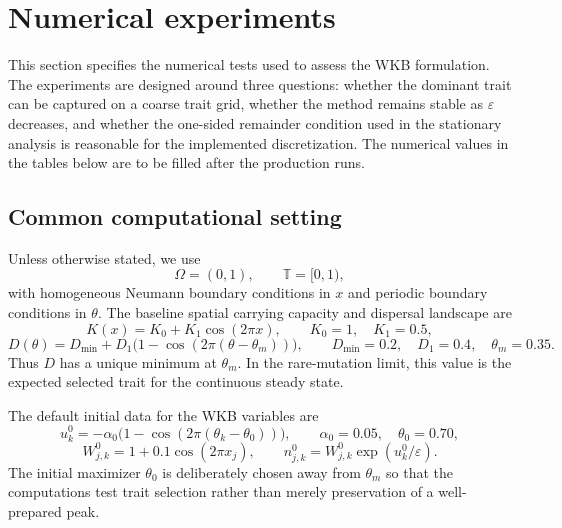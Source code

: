 \documentclass[11pt]{article}
\begin{document}

\section{Numerical experiments}

This section specifies the numerical tests used to assess the WKB formulation.
The experiments are designed around three questions: whether the dominant trait
can be captured on a coarse trait grid, whether the method remains stable as
\(\varepsilon\) decreases, and whether the one-sided remainder condition used
in the stationary analysis is reasonable for the implemented discretization.
The numerical values in the tables below are to be filled after the production
runs.

\subsection{Common computational setting}

Unless otherwise stated, we use
\[
    \Omega=(0,1),
    \qquad
    \mathbb T=[0,1),
\]
with homogeneous Neumann boundary conditions in \(x\) and periodic boundary
conditions in \(\theta\). The baseline spatial carrying capacity and dispersal
landscape are
\begin{equation}\label{eq:numerical_KD_baseline}
    K(x)=K_0+K_1\cos(2\pi x),
    \qquad
    K_0=1,
    \quad
    K_1=0.5,
\end{equation}
\begin{equation}\label{eq:numerical_D_baseline}
    D(\theta)
    =
    D_{\min}
    +D_1\bigl(1-\cos(2\pi(\theta-\theta_m))\bigr),
    \qquad
    D_{\min}=0.2,
    \quad
    D_1=0.4,
    \quad
    \theta_m=0.35 .
\end{equation}
Thus \(D\) has a unique minimum at \(\theta_m\). In the rare-mutation limit,
this value is the expected selected trait for the continuous steady state.

The default initial data for the WKB variables are
\begin{equation}\label{eq:numerical_initial_data}
    u_k^0
    =
    -\alpha_0
    \bigl(1-\cos(2\pi(\theta_k-\theta_0))\bigr),
    \qquad
    \alpha_0=0.05,
    \quad
    \theta_0=0.70,
\end{equation}
\[
    W_{j,k}^0=1+0.1\cos(2\pi x_j),
    \qquad
    n_{j,k}^0=W_{j,k}^0\exp(u_k^0/\varepsilon).
\]
The initial maximizer \(\theta_0\) is deliberately chosen away from
\(\theta_m\) so that the computations test trait selection rather than merely
preservation of a well-prepared peak.
\end{document}
